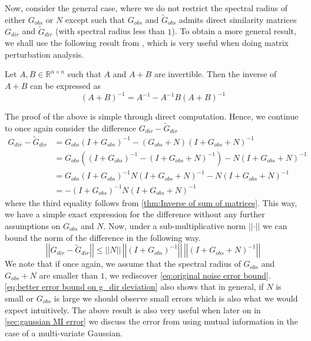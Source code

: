 \documentclass[../Thesis.tex]{subfiles}
\begin{document}
Now, consider the general case, where we do not restrict the spectral radius of either $G_{obs}$ or $N$ except such that $G_{obs}$ and $\tilde{G}_{obs}$ admits direct similarity matrices $G_{dir}$ and $\tilde{G}_{dir}$ (with spectral radius less than $1$). To obtain a more general result, we shall use the following result from \cite{On-Deriving-the-Inverse-of-a-Sum-of-Matrices}, which is very useful when doing matrix perturbation analysis.
\begin{theorem}\label{thm:Inverse of sum of matrices}
    Let $A,B\in \mathbb{R}^{n\times n}$ such that $A$ and $A+B$ are invertible. Then the inverse of $A+B$ can be expressed as
    $$\left(A+B\right)^{-1} = A^{-1} - A^{-1} B \left(A + B\right)^{-1}$$
\end{theorem}
The proof of the above is simple through direct computation. Hence, we continue to once again consider the difference $G_{dir} - \tilde{G}_{dir}$
\begin{align*}
    G_{dir} - \tilde{G}_{dir} & = G_{obs} \left(I + G_{obs}\right)^{-1} - \left(G_{obs} + N\right) \left(I + G_{obs} + N\right)^{-1}                             \\
                              & = G_{obs} \left( \left(I + G_{obs}\right)^{-1} - \left(I + G_{obs} + N\right)^{-1} \right) - N \left(I + G_{obs} + N\right)^{-1} \\
                              & = G_{obs} \left(I + G_{obs}\right)^{-1} N \left( I + G_{obs} + N \right)^{-1} - N \left(I + G_{obs} + N\right)^{-1}              \\
                              & = - \left(I + G_{obs}\right)^{-1} N \left(I + G_{obs} + N\right)^{-1}
\end{align*}
where the third equality follows from \autoref{thm:Inverse of sum of matrices}. This way, we have a simple exact expression for the difference without any further assumptions on $G_{obs}$ and $N$. Now, under a sub-multiplicative norm $\left|\left|\cdot\right|\right|$ we can bound the norm of the difference in the following way.
\begin{equation}\label{eq:better error bound on g_dir deviation}
    \left|\left|G_{dir} - \tilde{G}_{dir}\right|\right| \leq \left|\left| N \right|\right| \, \left|\left| \left(I + G_{obs}\right)^{-1} \right|\right|\, \left|\left| \left(I + G_{obs} + N\right)^{-1} \right|\right|
\end{equation}
We note that if once again, we assume that the spectral radius of $G_{obs}$ and $G_{obs} + N$ are smaller than $1$, we rediscover \autoref{eq:original noise error bound}. \autoref{eq:better error bound on g_dir deviation} also shows that in general, if $N$ is small or $G_{obs}$ is large we should observe small errors which is also what we would expect intuitively. The above result is also very useful when later on in \autoref{sec:gaussian MI error} we discuss the error from using mutual information in the case of a multi-variate Gaussian.
\end{document}
